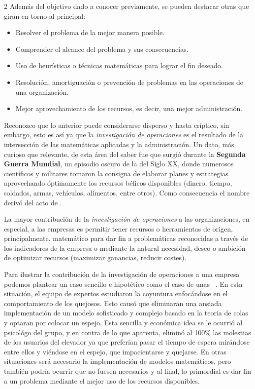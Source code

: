 \documentclass[12pt]{article}
\begin{document}
\begin{multicols}{2}
Además del objetivo dado a conocer previamente, se pueden destacar otras que giran en torno al principal:

\begin{itemize}
	\item Resolver el problema de la mejor manera posible.
	\item Comprender el alcance del problema y sus consecuencias.
	\item Uso de heurísticas o técnicas matemáticas para lograr el fin deseado.
	\item Resolución, amortiguación o prevención de problemas en las operaciones de una organización.
	\item Mejor aprovechamiento de los recursos, es decir, una mejor administración.
\end{itemize}

Reconozco que lo anterior puede considerarse disperso y hasta críptico, sin embargo, esto es así ya que la \textit{investigación de operaciones} es el resultado de la intersección de las matemáticas aplicadas y la administración. Un dato, más curioso que relevante, de esta área del saber fue que surgió durante la \textbf{Segunda Guerra Mundial}, un episodio oscuro de la  del Siglo XX, donde numerosos científicos y militares tomaron la consigna de elaborar planes y estrategias aprovechando óptimamente los recursos bélicos disponibles (dinero, tiempo, soldados, armas, vehículos, alimentos, entre otros). Como consecuencia el nombre derivó del acto de .
\newline

La mayor contribución de la \textit{investigación de operaciones} a las organizaciones, en especial, a las empresas es permitir tener recursos o herramientas de origen, principalmente, matemático para dar fin a problemáticas reconocidas a través de los indicadores de la empresa o mediante la natural necesidad, deseo o ambición de optimizar recursos (maximizar ganancias, reducir costes).
\newline

	Para ilustrar la contribución de la investigación de operaciones a una empresa podemos plantear un caso sencillo e hipotético como el caso de unas ~\cite{taha}. En esta situación, el equipo de expertos estudiaron la coyuntura enfocándose en el comportamiento de los quejosos. Esto causó que eliminaran una ansiada implementación de un modelo sofisticado y complejo basado en la teoría de colas y optaran por colocar un espejo. Esta sencilla y económica idea se le ocurrió al psicológo del grupo, y en contra de lo que aparenta, eliminó al 100\% las molestias de los usuarios del elevador ya que preferían pasar el tiempo de espera mirándose entre ellos y viéndose en el espejo, que impacientarse y quejarse. En otras situaciones será necesario la implementación de modelos matemáticos, pero también podría ocurrir que no fuesen necesarios y al final, lo primordial es dar fin a un problema mediante el mejor uso de los recursos disponibles.
\newline


\end{multicols}
\end{document}
